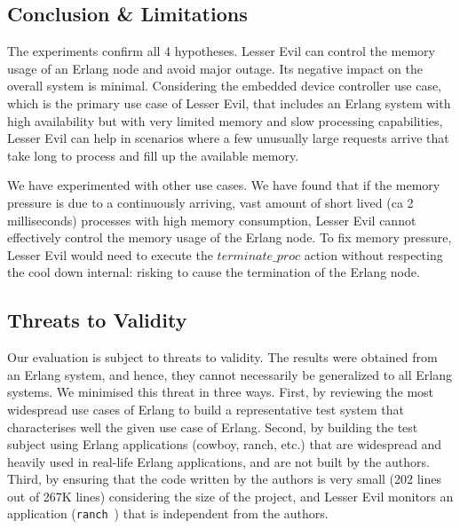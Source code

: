 \documentclass{llncs}
\begin{document}
\subsection{Conclusion \& Limitations}
\label{limitations}

The experiments confirm all 4 hypotheses. Lesser Evil can control the memory usage of an Erlang node and avoid major outage. Its negative impact on the overall system is minimal. Considering the embedded device controller use case, which is the primary use case of Lesser Evil, that includes an Erlang system with high availability but with very limited memory and slow processing capabilities, Lesser Evil can help in scenarios where a few unusually large requests arrive that take long to process and fill up the available memory. %

We have experimented with other use cases. We have found that if the memory pressure is due to a continuously arriving, vast amount of short lived (ca 2 milliseconds) processes with high memory consumption, Lesser Evil cannot effectively control the memory usage of the Erlang node. 
To fix memory pressure, Lesser Evil would need to execute the $terminate\_proc$ action without respecting the cool down internal: risking to cause the termination of the Erlang node.

\subsection{Threats to Validity}
Our evaluation is subject to threats to validity. The results were obtained from an Erlang system, and hence, they cannot necessarily be generalized to all Erlang systems. We minimised this threat in three ways. First, by reviewing the most widespread use cases of Erlang to  build a representative test system that characterises well the given use case of Erlang.  Second, by building the test subject using Erlang applications (cowboy, ranch, etc.) that are widespread and heavily used in real-life Erlang applications, and are not built by the authors. Third, by ensuring that the code written by the authors is very small (202 lines out of 267K lines) considering the size of the project, and Lesser Evil monitors an application (\verb+ranch+~\cite{ranch}) that is independent from the authors.
\end{document}
